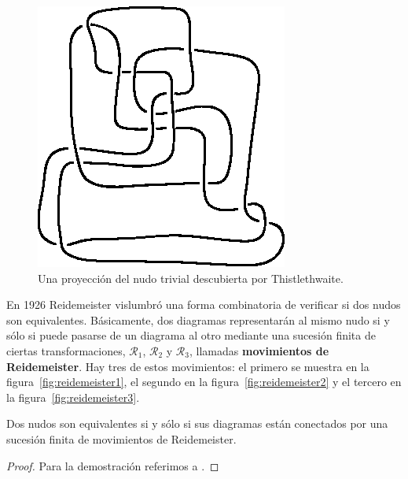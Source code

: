 \documentclass[graybox]{svmult}
\begin{document}
	\begin{figure}
    	\centering
		\includegraphics[scale=0.6]{images/thistlethwaite}
        \caption{Una proyección del nudo trivial descubierta por Thistlethwaite.}
        \label{fig:thistlethwaite}
    \end{figure}

    \label{block:reidemeister}
	En 1926 Reidemeister vislumbró una forma combinatoria de verificar si dos
	nudos son equivalentes. Básicamente, dos diagramas representarán al mismo
	nudo si y sólo si puede pasarse de un diagrama al otro mediante una
	sucesión finita de ciertas transformaciones, $\mathcal{R}_1$,
    $\mathcal{R}_2$ y $\mathcal{R}_3$, llamadas \textbf{movimientos de
	Reidemeister}.  Hay tres de estos movimientos:  el primero se muestra en la
	figura~\ref{fig:reidemeister1}, el segundo en la
	figura~\ref{fig:reidemeister2} y el tercero en la
	figura~\ref{fig:reidemeister3}. 

\begin{theorem}[Reidemeister]
	Dos nudos son equivalentes si y sólo si sus diagramas están conectados
	por una sucesión finita de movimientos de Reidemeister.
\end{theorem}

\begin{proof}
	Para la demostración referimos a \cite[1.14]{MR3156509}.
\end{proof}
\end{document}
